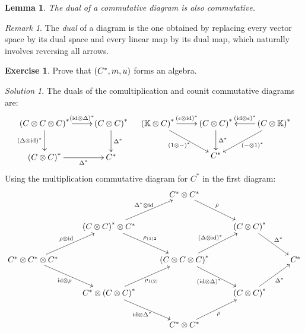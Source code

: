 \documentclass{article}
\newtheorem{Lemma}{Lemma}
\theoremstyle{definition}
\newtheorem{Exercise}{Exercise}
\theoremstyle{remark}
\newtheorem*{Remark*}{Remark}
\newtheorem*{Solution*}{Solution}
\theoremstyle{underline}
\theoremstyle{underline}
\newcommand{\id}{\mathrm{id}}
\begin{document}
 	\begin{Lemma}
 		The dual of a commutative diagram is also commutative.
 	\end{Lemma}
 
 	\begin{Remark*}
 		The \emph{dual} of a diagram is the one obtained by replacing every vector space by its dual space and every linear map by its dual map, which naturally involves reversing all arrows.
 	\end{Remark*}
 	
 	\begin{Exercise}
 		Prove that $\pqty{C^*, m, u}$ forms an algebra.
 	\end{Exercise}
 	\begin{Solution*}
 		The duals of the comultiplication and counit commutative diagrams are:
 		\begin{align*}
		\xymatrix{
			\pqty{C \otimes C \otimes C}^* \ar[r]^-{\pqty{\id \otimes \Delta}^*} \ar[d]_{\pqty{\Delta \otimes \id}^*} & \pqty{C \otimes C}^*   \ar[d]^-{\Delta^*} \\
			\pqty{C \otimes C}^* \ar[r]_-{\Delta^*} & C^*
		} & &
		\xymatrix{
			\pqty{\mathbb K \otimes C}^* \ar[r]^-{\pqty{\epsilon \otimes \id}^*} \ar[rd]_{\pqty{1 \otimes -}^*} & \pqty{C \otimes C}^* \ar[d]^{\Delta^*} & \pqty{C \otimes \mathbb K}^* \ar[l]_-{\pqty{\id \otimes \epsilon}^*} \ar[ld]^{\pqty{-\otimes 1}^*} \\
			& C^* &	
		}
		\end{align*}
		Using the multiplication commutative diagram for $C^*$ in the first diagram:
		\begin{align*}
		\xymatrix{
			& & C^* \otimes C^* \ar[rd]^-{\rho} & &  \\
			& \pqty{C \otimes C}^* \otimes C^* \ar[rd]^-{\rho_{(1)2}} \ar[ru]^-{\Delta^* \otimes \id} & & \pqty{C \otimes C}^* \ar[rd]^-{\Delta^*} & \\
			{C^* \otimes C^* \otimes C^*} \ar[ru]^-{\rho \otimes \id} \ar[rd]_-{\id \otimes \rho} & & \pqty{C \otimes C \otimes C}^* \ar[ru]^-{\pqty{\Delta \otimes \id}^*} \ar[rd]_-{\pqty{\id \otimes \Delta}^*} & & C^*\\
			& C^* \otimes \pqty{C \otimes C}^* \ar[ru]_-{\rho_{1(2)}} \ar[rd]_-{\id \otimes \Delta^*} & & \pqty{C \otimes C}^* \ar[ru]_-{\Delta^*} & \\  
			& & C^* \otimes C^* \ar[ru]_-{\rho} & & 
			}
		\end{align*}
 	\end{Solution*}
	
\end{document}
